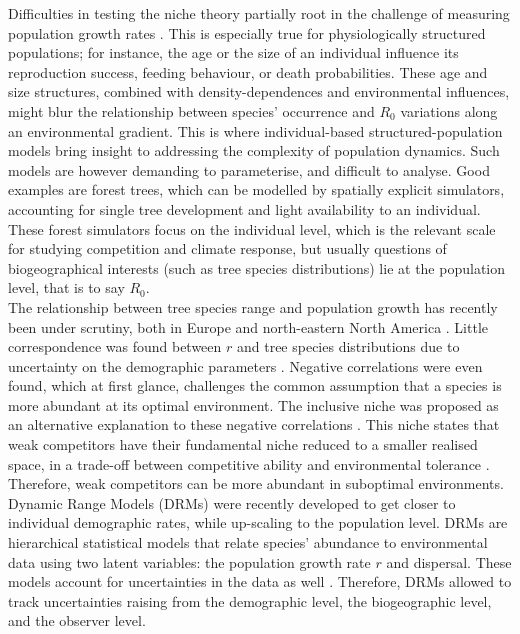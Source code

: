 Difficulties in testing the niche theory partially root in the challenge of measuring population growth rates \citep{McGill2012}. This is especially true for physiologically structured populations; for instance, the age or the size of an individual influence its reproduction success, feeding behaviour, or death probabilities. These age and size structures, combined with density-dependences and environmental influences, might blur the relationship between species' occurrence and $ R_0 $ variations along an environmental gradient. This is where individual-based structured-population models bring insight to addressing the complexity of population dynamics. Such models are however demanding to parameterise, and difficult to analyse. Good examples are forest trees, which can be modelled by spatially explicit simulators, accounting for single tree development and light availability to an individual. These forest simulators focus on the individual level, which is the relevant scale for studying competition and climate response, but usually questions of biogeographical interests (such as tree species distributions) lie at the population level, that is to say $ R_0 $. \\

The relationship between tree species range and population growth has recently been under scrutiny, both in Europe \citep{Thuiller2014} and north-eastern North America \citep{McGill2012}. Little correspondence was found between $ r $ and tree species distributions due to uncertainty on the demographic parameters \citep{Thuiller2014}. Negative correlations were even found, which at first glance, challenges the common assumption that a species is more abundant at its optimal environment. The inclusive niche was proposed as an alternative explanation to these negative correlations \citep{McGill2012}. This niche states that weak competitors have their fundamental niche reduced to a smaller realised space, in a trade-off between competitive ability and environmental tolerance \citep{Serrano2015}. Therefore, weak competitors can be more abundant in suboptimal environments. \\

Dynamic Range Models (DRMs) were recently developed to get closer to individual demographic rates, while up-scaling to the population level. DRMs are hierarchical statistical models that relate species' abundance to environmental data using two latent variables: the population growth rate $ r $ and dispersal. These models account for uncertainties in the data as well \citep{Pagel2012}. Therefore, DRMs allowed to track uncertainties raising from the demographic level, the biogeographic level, and the observer level. \\

